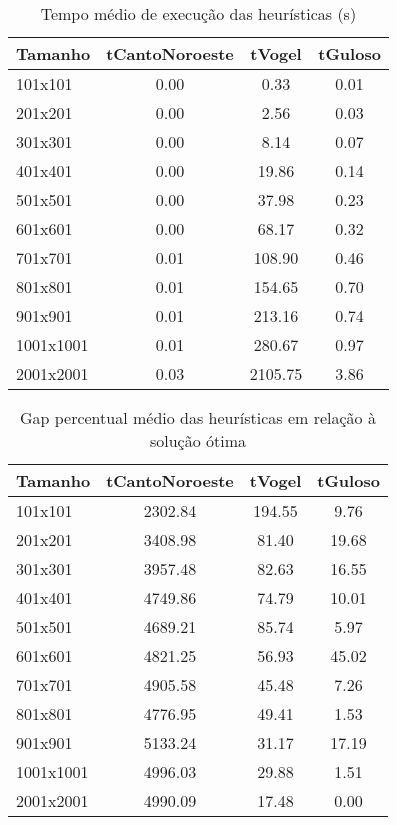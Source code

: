 \begin{table}[htbp]
\centering
\caption{Tempo médio de execução das heurísticas (s)}
\label{tab:tempo_heuristicas}
\begin{tabular}{lccc}
\toprule
Tamanho & tCantoNoroeste & tVogel & tGuloso \\
\midrule
101x101 & 0.00 & 0.33 & 0.01 \\
201x201 & 0.00 & 2.56 & 0.03 \\
301x301 & 0.00 & 8.14 & 0.07 \\
401x401 & 0.00 & 19.86 & 0.14 \\
501x501 & 0.00 & 37.98 & 0.23 \\
601x601 & 0.00 & 68.17 & 0.32 \\
701x701 & 0.01 & 108.90 & 0.46 \\
801x801 & 0.01 & 154.65 & 0.70 \\
901x901 & 0.01 & 213.16 & 0.74 \\
1001x1001 & 0.01 & 280.67 & 0.97 \\
2001x2001 & 0.03 & 2105.75 & 3.86 \\
\bottomrule
\end{tabular}
\end{table}


\begin{table}[htbp]
\centering
\caption{Gap percentual médio das heurísticas em relação à solução ótima}
\label{tab:gap_heuristicas}
\begin{tabular}{lccc}
\toprule
Tamanho & tCantoNoroeste & tVogel & tGuloso \\
\midrule
101x101 & 2302.84 & 194.55 & 9.76 \\
201x201 & 3408.98 & 81.40 & 19.68 \\
301x301 & 3957.48 & 82.63 & 16.55 \\
401x401 & 4749.86 & 74.79 & 10.01 \\
501x501 & 4689.21 & 85.74 & 5.97 \\
601x601 & 4821.25 & 56.93 & 45.02 \\
701x701 & 4905.58 & 45.48 & 7.26 \\
801x801 & 4776.95 & 49.41 & 1.53 \\
901x901 & 5133.24 & 31.17 & 17.19 \\
1001x1001 & 4996.03 & 29.88 & 1.51 \\
2001x2001 & 4990.09 & 17.48 & 0.00 \\
\bottomrule
\end{tabular}
\end{table}
